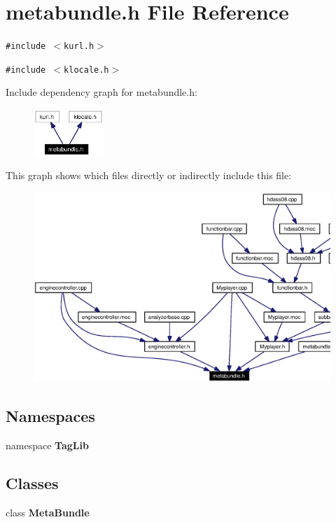 \section{metabundle.h File Reference}
\label{metabundle_8h}


{\tt \#include $<$kurl.h$>$}\par
{\tt \#include $<$klocale.h$>$}\par


Include dependency graph for metabundle.h:\begin{figure}[H]
\begin{center}
\leavevmode
\includegraphics[width=75pt]{metabundle_8h__incl}
\end{center}
\end{figure}


This graph shows which files directly or indirectly include this file:\begin{figure}[H]
\begin{center}
\leavevmode
\includegraphics[width=398pt]{metabundle_8h__dep__incl}
\end{center}
\end{figure}
\subsection*{Namespaces}
\begin{CompactItemize}
\item 
namespace {\bf Tag\-Lib}
\end{CompactItemize}
\subsection*{Classes}
\begin{CompactItemize}
\item 
class {\bf Meta\-Bundle}
\end{CompactItemize}
